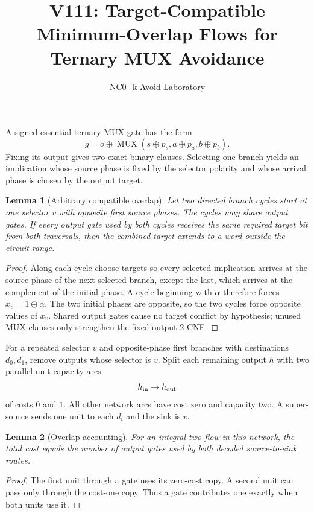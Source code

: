 \documentclass[11pt]{article}
\newtheorem{lemma}{Lemma}
\begin{document}
\title{V111: Target-Compatible Minimum-Overlap Flows for Ternary MUX Avoidance}
\author{NC0\_k-Avoid Laboratory}
\date{}
\maketitle

A signed essential ternary MUX gate has the form
\[
 g=o\oplus \operatorname{MUX}(s\oplus p_s,a\oplus p_a,b\oplus p_b).
\]
Fixing its output gives two exact binary clauses.  Selecting one branch yields an
implication whose source phase is fixed by the selector polarity and whose arrival
phase is chosen by the output target.

\begin{lemma}[Arbitrary compatible overlap]
Let two directed branch cycles start at one selector $v$ with opposite first
source phases.  The cycles may share output gates.  If every output gate used by
both cycles receives the same required target bit from both traversals, then the
combined target extends to a word outside the circuit range.
\end{lemma}

\begin{proof}
Along each cycle choose targets so every selected implication arrives at the
source phase of the next selected branch, except the last, which arrives at the
complement of the initial phase.  A cycle beginning with $\alpha$ therefore
forces $x_v=1\oplus\alpha$.  The two initial phases are opposite, so the two
cycles force opposite values of $x_v$.  Shared output gates cause no target
conflict by hypothesis; unused MUX clauses only strengthen the fixed-output
2-CNF.
\end{proof}

For a repeated selector $v$ and opposite-phase first branches with destinations
$d_0,d_1$, remove outputs whose selector is $v$.  Split each remaining output
$h$ with two parallel unit-capacity arcs
\[
 h_{\rm in}\to h_{\rm out}
\]
of costs $0$ and $1$.  All other network arcs have cost zero and capacity two.
A super-source sends one unit to each $d_i$ and the sink is $v$.

\begin{lemma}[Overlap accounting]
For an integral two-flow in this network, the total cost equals the number of
output gates used by both decoded source-to-sink routes.
\end{lemma}

\begin{proof}
The first unit through a gate uses its zero-cost copy.  A second unit can pass
only through the cost-one copy.  Thus a gate contributes one exactly when both
units use it.
\end{proof}
\end{document}
